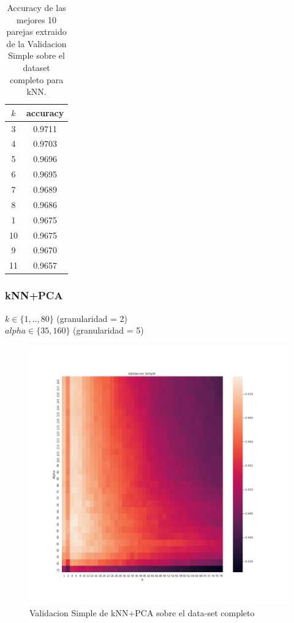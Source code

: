 \begin{table}[h!]
    \begin{center}
        \begin{tabular}{|c|c|}
        \hline
        \textbf{$k$} & \textbf{accuracy} \\
        \hline
        3 &  0.9711\\
        4 & 0.9703\\
        5 & 0.9696\\
        6 & 0.9695\\
        7 &  0.9689\\
        8 & 0.9686\\
        1 & 0.9675\\
        10 & 0.9675\\
        9 & 0.9670\\
        11 & 0.9657\\
        
        \hline
        \end{tabular}
        \caption{Accuracy de las mejores 10 parejas extraido de la Validacion Simple sobre el dataset completo para kNN.}
        \label{knn_valSimple_table}
    \end{center}
\end{table}

\subsubsection{kNN+PCA}

\par

$ k \in \{1,..,80\}$ (granularidad = 2)\\$alpha \in \{  35, 160 \}$ (granularidad = 5)

\begin{figure}[H]
    \centering
    \includegraphics[width=12cm]{images/validacionSimple_datasetCompleto_knnpca_k80}%
    \qquad
    \caption{Validacion Simple de kNN+PCA sobre el data-set completo}
    \label{knnpca_valSimpleCompleto}%
\end{figure}


